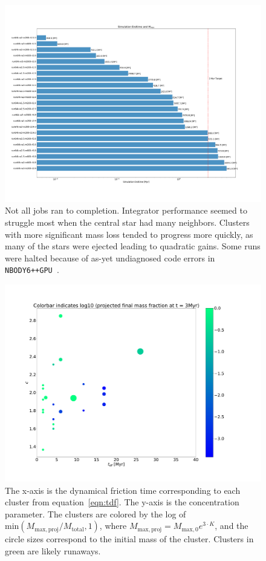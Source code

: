 \documentclass{princeton_astro_thesis}
\newcommand\nbody{\texttt{NBODY6++GPU }}
\numberwithin{equation}{section}
\begin{document}
\begin{figure}
    \centering
    \includegraphics{JobProgress}
    \vspace*{-10mm}    
    \caption{Not all jobs ran to completion. Integrator performance seemed to struggle most when the central star had many neighbors.  Clusters with more significant mass loss tended to progress more quickly, as many of the stars were ejected leading to quadratic gains.  Some runs were halted because of as-yet undiagnosed code errors in \nbody.}
    \label{fig:JobProgress}
\end{figure}

\begin{figure}
    \centering
    \includegraphics[width=1.3\textwidth]{kplot}
    \caption{The x-axis is the dynamical friction time corresponding to each cluster from equation~\ref{eqn:tdf}.  The y-axis is the concentration parameter.  The clusters are colored by the log of $\mathrm{min}(M_{\mathrm{max, proj}}/M_{\mathrm{total}}, 1)$, where $M_{\mathrm{max, proj}} = M_{\mathrm{max}, 0}e^{3 \cdot K}$, and the circle sizes correspond to the initial mass of the cluster. Clusters in green are likely runaways.}
    \label{fig:Kplot}
\end{figure}
\end{document}
